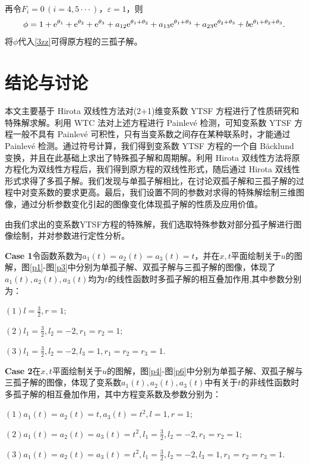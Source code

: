 \documentclass[11pt,a4paper]{ctexart}
\begin{document}
再令$F_i=0\,(i=4,5\cdot \cdot \cdot)$，$\varepsilon =1$，则
\begin{equation}
    \phi=1+\text e^{\theta_1}+\text e^{\theta_2}+\text e^{\theta_3}+a_{12}\text e^{\theta_1+\theta_2}+a_{13}\text e^{\theta_1+\theta_3}+a_{23}\text e^{\theta_2+\theta_3}+b\text e^{\theta_1+\theta_2+\theta_3}.
\end{equation}
将$\phi$代入\eqref{3zz}可得原方程的三孤子解。

\section{结论与讨论}

本文主要基于 Hirota 双线性方法对(2+1)维变系数 YTSF 方程进行了性质研究和特殊解求解。利用 WTC 法对上述方程进行 Painlev\'{e} 检测，可知变系数 YTSF 方程一般不具有 Painlev\'{e} 可积性，只有当变系数之间存在某种联系时，才能通过 Painlev\'{e} 检测。通过符号计算，我们得到变系数 YTSF 方程的一个自 B\"{a}cklund 变换，并且在此基础上求出了特殊孤子解和周期解。利用 Hirota 双线性方法将原方程化为双线性方程后，我们得到原方程的双线性形式，随后通过 Hirota 双线性形式求得了多孤子解。我们发现与单孤子解相比，在讨论双孤子解和三孤子解的过程中对变系数的要求更高。最后，我们设置不同的参数对求得的特殊解绘制三维图像，通过分析参数变化引起的图像变化体现孤子解的性质及应用价值。

由我们求出的变系数YTSF方程的特殊解，我们选取特殊参数对部分孤子解进行图像绘制，并对参数进行定性分析。

\noindent\textbf{Case 1}\quad 令函数系数为$a_1(t)=a_2(t)=a_3(t)=t$，并在$x,t$平面绘制关于$u$的图解，图\ref{p1}-图\ref{p3}中分别为单孤子解、双孤子解与三孤子解的图像，体现了$a_1(t),a_2(t),a_3(t)$均为$t$的线性函数时多孤子解的相互叠加作用,其中参数分别为：


$(1)l=\frac{3}{2},r=1;$

$(2)l_1=\frac{3}{2},l_2=-2,r_1=r_2=1;$

$(3)l_1=\frac{3}{2},l_2=-2,l_3=1,r_1=r_2=r_3=1.$



\noindent\textbf{Case 2}\quad 在$x,t$平面绘制关于$u$的图解，图\ref{p4}-图\ref{p6}中分别为单孤子解、双孤子解与三孤子解的图像，体现了变系数$a_1(t),a_2(t),a_3(t)$中有关于$t$的非线性函数时多孤子解的相互叠加作用，其中方程变系数及参数分别为：


$(1)a_1(t)=a_2(t)=t,a_3(t)=t^2,l=1,r=1;$

$(2)a_1(t)=a_2(t)=a_3(t)=t^2,l_1=\frac{3}{2},l_2=-2,r_1=r_2=1;$

$(3)a_1(t)=a_2(t)=a_3(t)=t^2,l_1=\frac{3}{2},l_2=-2,l_3=1,r_1=r_2=r_3=1.$
\end{document}
